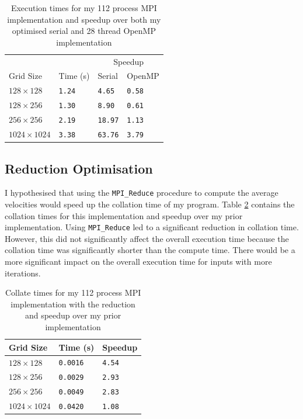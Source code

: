 \documentclass[twocolumn, a4paper]{article}
\begin{document}
\begin{table}[htbp]
  \begin{center}
  \caption{Execution times for my 112 process MPI implementation and speedup over both my optimised serial and 28 thread OpenMP implementation}\label{tab:mpi}
  \begin{tabular}[t]{l | l  l  l} 
      \hline\hline
      &&\multicolumn{2}{c}{Speedup}\\
      \cline{3-4}
      Grid Size&Time (s)&Serial&OpenMP\\
      \hline
      $128 \times 128$&\texttt{1.24}&\texttt{4.65}&\texttt{0.58}\\
      $128 \times 256$&\texttt{1.30}&\texttt{8.90}&\texttt{0.61}\\
      $256 \times 256$&\texttt{2.19}&\texttt{18.97}&\texttt{1.13}\\
      $1024 \times 1024$&\texttt{3.38}&\texttt{63.76}&\texttt{3.79}\\
      \hline
    \end{tabular}
  \end{center}
  \vspace{-1em}
\end{table}

\subsection{Reduction Optimisation}

I hypothesised that using the \texttt{MPI\_Reduce} procedure to compute the average velocities would speed up the collation time of my program.
Table \ref{tab:reduction} contains the collation times for this implementation and speedup over my prior implementation.
Using \texttt{MPI\_Reduce} led to a significant reduction in collation time.
However, this did not significantly affect the overall execution time because the collation time was significantly shorter than the compute time.
There would be a more significant impact on the overall execution time for inputs with more iterations.

\begin{table}[htbp]
  \begin{center}
  \caption{Collate times for my 112 process MPI implementation with the reduction and speedup over my prior implementation}\label{tab:reduction}
  \begin{tabular}[t]{l | l l} 
      \hline\hline
      Grid Size&Time (s)&Speedup\\
      \hline
      $128 \times 128$&\texttt{0.0016}&\texttt{4.54}\\
      $128 \times 256$&\texttt{0.0029}&\texttt{2.93}\\
      $256 \times 256$&\texttt{0.0049}&\texttt{2.83}\\
      $1024 \times 1024$&\texttt{0.0420}&\texttt{1.08}\\
      \hline
    \end{tabular}
  \end{center}
  \vspace{-1em}
\end{table}
\end{document}
